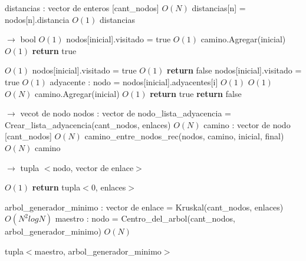 \documentclass[a4paper, 10pt, twoside]{article}
\newenvironment{pseudo}[1][]{%
    \vspace{1em}%
    \begin{algorithmic}%
}
{%
    \end{algorithmic}%
    \vspace{1em}%
}
\newcommand{\Ode}[1]{\hfill $O(#1)$}
\begin{document}
\begin{pseudo}
  \State distancias : vector de enteros [cant\_nodos]             \Ode{N}
    \State distancias[n] = nodos[n].distancia               \Ode{1}
  \EndFor
  \Return distancias
\EndProcedure

 $\rightarrow$ bool
                                 \Ode{1}
        \State nodos[inicial].visitado = true                   \Ode{1}
        \State camino.Agregar(inicial)                        \Ode{1}
        \State \textbf{return} true
    \EndIf

                       \Ode{1}
        \State nodos[inicial].visitado = true                   \Ode{1}
        \State \textbf{return} false
    \Else
        \State nodos[inicial].visitado = true                   \Ode{1}
          \State adyacente : nodo = nodos[inicial].adyacentes[i]          \Ode{1}
                                 \Ode{1}
                   \Ode{N}
                    \State camino.Agregar(inicial)                  \Ode{1}
                    \textbf{return} true
                \EndIf
            \EndIf
        \EndFor
        \State \textbf{return} false
    \EndIf
\EndProcedure

 $\rightarrow$ vecot de nodo
    \State nodos : vector de nodo\_lista\_adyacencia = Crear\_lista\_adyacencia(cant\_nodos, enlaces) \Ode{N}
    \State camino : vector de nodo [cant\_nodos]                      \Ode{N}
    \State camino\_entre\_nodos\_rec(nodos, camino, inicial, final)             \Ode{N}
    \Return camino
\EndProcedure


 $\rightarrow$ tupla $<$nodo, vector de enlace$>$

                                 \Ode{1}
    \State \textbf{return} tupla$<$0, enlaces$>$
  \EndIf

  \State arbol\_generador\_minimo : vector de enlace = Kruskal(cant\_nodos, enlaces) \Ode{N^2 log N}
  \State maestro : nodo = Centro\_del\_arbol(cant\_nodos, arbol\_generador\_minimo) \Ode{N}

    \Return tupla$<$maestro, arbol\_generador\_minimo$>$
\EndProcedure
\end{pseudo}
\end{document}
